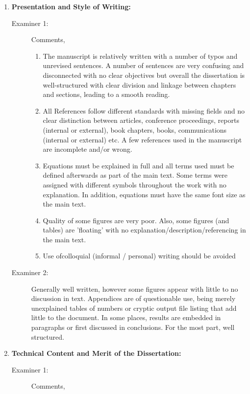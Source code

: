 \documentclass[14pt,twoside]{report}
\begin{document}
\medskip

\begin{enumerate}
%
    \item {\bf Presentation and Style of Writing:}
        \begin{description}
            \item[Examiner 1:] Comments,
                \begin{enumerate}
                   \item The manuscript is relatively written with a number of typos and unrevised sentences. A number of sentences are very confusing and disconnected with no clear objectives but overall the dissertation is well-structured with clear division and linkage between chapters and sections, leading to a smooth reading.
                   \item All References follow different standards with missing fields and no clear distinction between articles, conference proceedings, reports (internal or external), book chapters, books, communications (internal or external) etc.  A few references used in the manuscript are incomplete and/or wrong.
                   \item Equations must be explained in full and all terms used must be defined afterwards as part of the main text. Some terms were assigned with different symbols throughout the work with no explanation. In addition, equations must have the same font size as the main text.
                   \item Quality of some figures are very poor. Also, some figures (and  tables) are 'floating' with no explanation/description/referencing in the main text.
                   \item Use ofcolloquial (informal / personal) writing should be avoided
                \end{enumerate}
            \item[Examiner 2:] Generally well written, however some figures appear with little  to no discussion in text. Appendices are of questionable use, being merely unexplained tables of numbers or cryptic output file listing that add little to the document. In some places, results are embedded in paragraphs or first discussed in conclusions. For the most part, well structured.
        \end{description}
%
    \item {\bf Technical Content and Merit of the Dissertation:}
        \begin{description}
            \item[Examiner 1:] Comments,

\end{description}
\end{enumerate}
\end{document}
